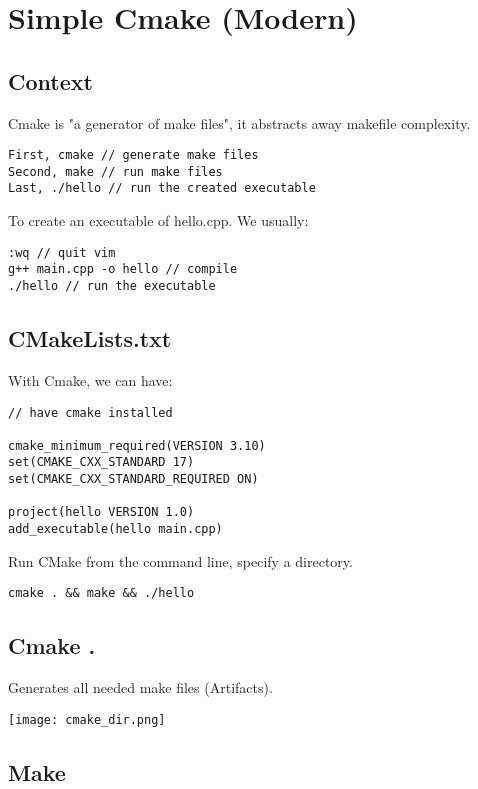 \section{Simple Cmake (Modern)}

\subsection{Context}

Cmake is "a generator of make files", it abstracts away makefile complexity.

\begin{verbatim}
First, cmake // generate make files
Second, make // run make files
Last, ./hello // run the created executable
\end{verbatim}

To create an executable of hello.cpp. We usually:
\begin{verbatim}
:wq // quit vim
g++ main.cpp -o hello // compile 
./hello // run the executable
\end{verbatim}

\subsection{CMakeLists.txt}

With Cmake, we can have:

\begin{verbatim}
// have cmake installed

cmake_minimum_required(VERSION 3.10)
set(CMAKE_CXX_STANDARD 17)
set(CMAKE_CXX_STANDARD_REQUIRED ON)

project(hello VERSION 1.0)
add_executable(hello main.cpp)
\end{verbatim}

Run CMake from the command line, specify a directory.
\begin{verbatim}
cmake . && make && ./hello
\end{verbatim}

\subsection{Cmake .  }

Generates all needed make files (Artifacts).

\begin{center}
    \texttt{[image: cmake\_dir.png]}
\end{center}

\subsection{Make}

